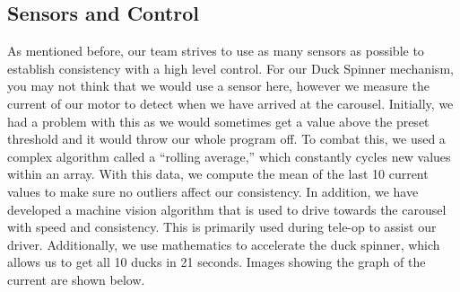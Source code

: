 


\subsection*{Sensors and Control}
As mentioned before, our team strives to use as many sensors as possible to establish consistency with a high level control. For our Duck Spinner mechanism, you may not think that we would use a sensor here, however we measure the current of our motor to detect when we have arrived at the carousel. Initially, we had a problem with this as we would sometimes get a value above the preset threshold and it would throw our whole program off. To combat this, we used a complex algorithm called a “rolling average,” which constantly cycles new values within an array. With this data, we compute the mean of the last 10 current values to make sure no outliers affect our consistency. In addition, we have developed a machine vision algorithm that is used to drive towards the carousel with speed and consistency. This is primarily used during tele-op to assist our driver. Additionally, we use mathematics to accelerate the duck spinner, which allows us to get all 10 ducks in 21 seconds. Images showing the graph of the current are shown below.

